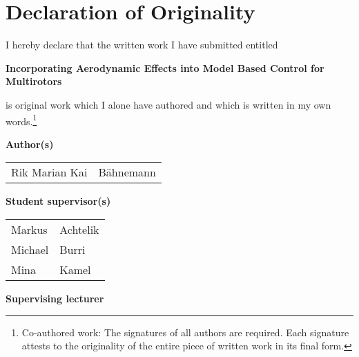 
\section*{Declaration of Originality}

\vspace{1cm}

I hereby declare that the written work I have submitted entitled

\vspace{0.5cm}

\textbf{Incorporating Aerodynamic Effects into Model Based Control
for Multirotors}

\vspace{0.5cm}

is original work which I alone have authored and which is written in my own words.\footnote{Co-authored work: The signatures of all authors are required. Each signature attests to the originality of the entire piece of written work in its final form.}

\vspace{1cm}

\textbf{Author(s)}

\vspace{0.5cm}

\begin{tabular}{ p{5cm} p{5cm} }
  Rik Marian Kai & Bähnemann \\
\end{tabular}

\vspace{0.5cm}

\textbf{Student supervisor(s)}

\vspace{0.5cm}

\begin{tabular}{ p{5cm} p{5cm} }
  Markus 		& Achtelik \\
  Michael 		& Burri \\
  Mina		& Kamel \\
\end{tabular}

\vspace{0.5cm}

\textbf{Supervising lecturer}

